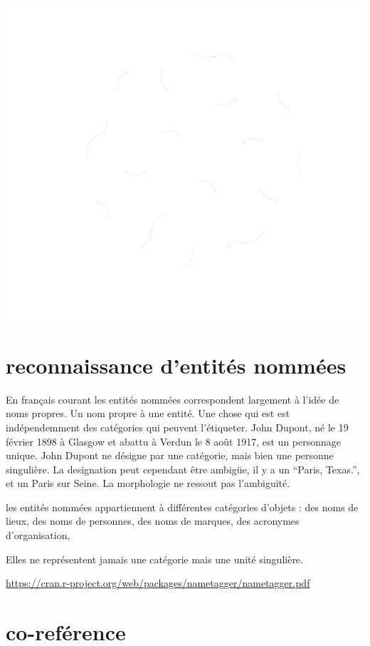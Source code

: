 \documentclass[
]{book}
\begin{document}
\includegraphics{bookdown-demo_files/figure-latex/75-1.pdf}

\hypertarget{reconnaissance-dentituxe9s-nommuxe9es}{%
\section{reconnaissance d'entités nommées}\label{reconnaissance-dentituxe9s-nommuxe9es}}

En français courant les entités nommées correspondent largement à l'idée de noms propres. Un nom propre à une entité. Une chose qui est est indépendemment des catégories qui peuvent l'étiqueter. John Dupont, né le 19 février 1898 à Glasgow et abattu à Verdun le 8 août 1917, est un personnage unique. John Dupont ne désigne par une catégorie, mais bien une personne singulière. La designation peut cependant être ambigüe, il y a un ``Paris, Texas.'', et un Paris sur Seine. La morphologie ne ressout pas l'ambiguité.

les entités nommées appartiennent à différentes catégories d'objets : des noms de lieux, des noms de personnes, des noms de marques, des acronymes d'organisation,

Elles ne représentent jamais une catégorie mais une unité singulière.

\url{https://cran.r-project.org/web/packages/nametagger/nametagger.pdf}

\hypertarget{co-refuxe9rence}{%
\section{co-reférence}\label{co-refuxe9rence}}
\end{document}
